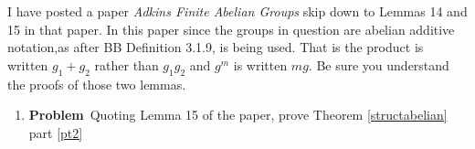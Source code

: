\documentclass[12pt]{amsart}
\theoremstyle{definition}
\newcommand{\itep}{\item {\bfseries Problem}\ }
\begin{document}
 I have posted a paper {\em Adkins Finite Abelian Groups} skip down to Lemmas 14 and 15 in that paper. In this paper since the groups in question are abelian additive notation,as after BB Definition 3.1.9, is being used. That is the product is written $g_1+g_2$ rather than $g_1g_2$ and $g^m$ is written $mg$. Be sure you understand the proofs of those two lemmas.

\begin{enumerate}[resume=p]
\itep Quoting Lemma 15 of the paper, prove Theorem \ref{structabelian} part \ref{pt2}
\end{enumerate}
\end{document}
